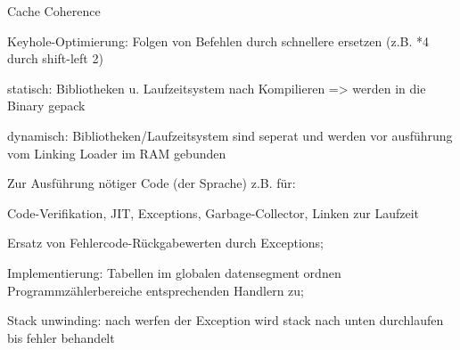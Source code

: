 Cache Coherence

Keyhole-Optimierung: Folgen von Befehlen durch schnellere ersetzen (z.B. *4 durch shift-left 2)

statisch: Bibliotheken u. Laufzeitsystem nach Kompilieren => werden in die Binary gepack

dynamisch: Bibliotheken/Laufzeitsystem sind seperat und werden vor ausführung vom Linking Loader im RAM gebunden


Zur Ausführung nötiger Code (der Sprache) z.B. für:

Code-Verifikation, JIT, Exceptions, Garbage-Collector, Linken zur Laufzeit

Ersatz von Fehlercode-Rückgabewerten durch Exceptions;

Implementierung: Tabellen im globalen datensegment ordnen Programmzählerbereiche entsprechenden Handlern zu; 

Stack unwinding: nach werfen der Exception wird stack nach unten durchlaufen bis fehler behandelt

